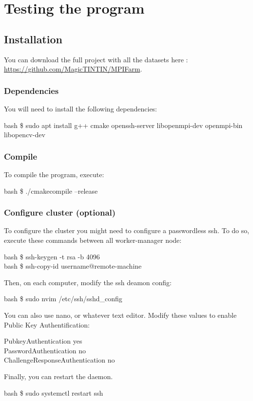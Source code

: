 \section{Testing the program}
\subsection{Installation}
You can download the full project with all the datasets here : \url{https://github.com/MagicTINTIN/MPIFarm}.
\subsubsection{Dependencies}
You will need to install the following dependencies:
\begin{resultbox}
    bash \$ sudo apt install g++ cmake openssh-server libopenmpi-dev openmpi-bin libopencv-dev
\end{resultbox}

\subsubsection{Compile}
To compile the program, execute:
\begin{resultbox}
    bash \$ ./cmakecompile --release
\end{resultbox}

\subsubsection{Configure cluster (optional)}
To configure the cluster you might need to configure a passwordless ssh. To do so, execute these commands between all worker-manager node:
\begin{resultbox}
    bash \$ ssh-keygen -t rsa -b 4096\\
    bash \$ ssh-copy-id username@remote-machine
\end{resultbox}
Then, on each computer, modify the ssh deamon config:
\begin{resultbox}
    bash \$ sudo nvim /etc/ssh/sshd\_config
\end{resultbox}
You can also use nano, or whatever text editor. Modify these values to enable Public Key Authentification:
\begin{resultbox}
PubkeyAuthentication yes\\
PasswordAuthentication no\\
ChallengeResponseAuthentication no
\end{resultbox}
Finally, you can restart the daemon.
\begin{resultbox}
    bash \$ sudo systemctl restart ssh
\end{resultbox}

